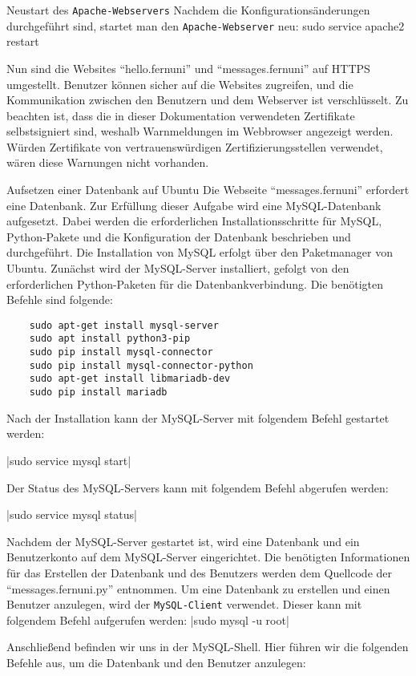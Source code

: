 Neustart des \verb+Apache-Webservers+
Nachdem die Konfigurationsänderungen durchgeführt sind, startet man den \verb+Apache-Webserver+ neu:
sudo service apache2 restart

Nun sind die Websites \enquote{hello.fernuni} und \enquote{messages.fernuni} auf HTTPS umgestellt. Benutzer können sicher auf die Websites zugreifen, und die Kommunikation zwischen den Benutzern und dem Webserver ist verschlüsselt.
Zu beachten ist, dass die in dieser Dokumentation verwendeten Zertifikate selbstsigniert sind, weshalb Warnmeldungen im Webbrowser angezeigt werden. Würden Zertifikate von vertrauenswürdigen Zertifizierungsstellen verwendet, wären diese Warnungen nicht vorhanden.

Aufsetzen einer Datenbank auf Ubuntu
Die Webseite \enquote{messages.fernuni} erfordert eine Datenbank. Zur Erfüllung dieser Aufgabe wird eine MySQL-Datenbank aufgesetzt. Dabei werden die erforderlichen Installationsschritte für MySQL, Python-Pakete und die Konfiguration der Datenbank beschrieben und durchgeführt.
Die Installation von MySQL erfolgt über den Paketmanager von Ubuntu. Zunächst wird der MySQL-Server installiert, gefolgt von den erforderlichen Python-Paketen für die Datenbankverbindung. Die benötigten Befehle sind folgende:

\begin{verbatim}
    sudo apt-get install mysql-server
    sudo apt install python3-pip
    sudo pip install mysql-connector
    sudo pip install mysql-connector-python
    sudo apt-get install libmariadb-dev
    sudo pip install mariadb
\end{verbatim}

Nach der Installation kann der MySQL-Server mit folgendem Befehl gestartet werden:

|sudo service mysql start|

Der Status des MySQL-Servers kann mit folgendem Befehl abgerufen werden:

|sudo service mysql status|

Nachdem der MySQL-Server gestartet ist, wird eine Datenbank und ein Benutzerkonto auf dem MySQL-Server eingerichtet. Die benötigten Informationen für das Erstellen der Datenbank und des Benutzers werden dem Quellcode der \enquote{messages.fernuni.py} entnommen.
Um eine Datenbank zu erstellen und einen Benutzer anzulegen, wird der \verb+MySQL-Client+ verwendet. Dieser kann mit folgendem Befehl aufgerufen werden:
|sudo mysql -u root|

Anschließend befinden wir uns in der MySQL-Shell. Hier führen wir die folgenden Befehle aus, um die Datenbank und den Benutzer anzulegen:

